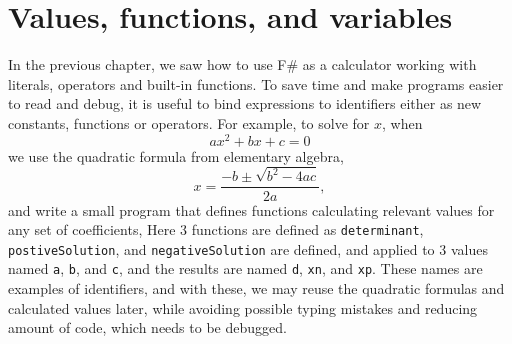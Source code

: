 \chapter{Values, functions, and variables}
\label{chap:let}
%
In the previous chapter, we saw how to use F\# as a calculator working with literals, operators and built-in functions. To save time and make programs easier to read and debug, it is useful to bind expressions to identifiers either as new constants, functions or operators. For example, to solve for  $x$, when
\begin{equation}
  a x^2+bx+c = 0
\end{equation}
we use the quadratic formula from elementary algebra,
\begin{equation}
  x = \frac{-b\pm\sqrt{b^2-4ac}}{2a},
\end{equation}
and write a small program that defines functions calculating relevant values for any set of coefficients,
%
%
Here 3 functions are defined as \lstinline!determinant!, \lstinline!postiveSolution!, and \lstinline!negativeSolution! are defined, and applied to 3 values named \lstinline!a!, \lstinline!b!, and \lstinline!c!, and the results are named \lstinline!d!, \lstinline!xn!, and \lstinline!xp!. These names are examples of identifiers, and with these, we may reuse the quadratic formulas and calculated values later, while avoiding possible typing mistakes and reducing amount of code, which needs to be debugged.

